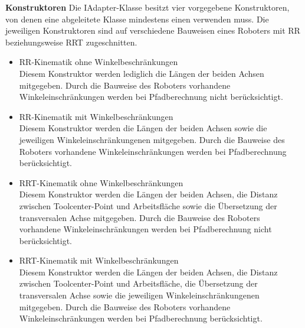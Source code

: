 \textbf{Konstruktoren}
Die IAdapter-Klasse besitzt vier vorgegebene Konstruktoren, von denen eine abgeleitete Klasse mindestens einen verwenden muss. Die jeweiligen Konstruktoren sind auf verschiedene Bauweisen eines Roboters mit RR beziehungsweise RRT zugeschnitten.
\begin{itemize}
\item RR-Kinematik ohne Winkelbeschränkungen\\
Diesem Konstruktor werden lediglich die Längen der beiden Achsen mitgegeben. Durch die Bauweise des Roboters vorhandene Winkeleinschränkungen werden bei Pfadberechnung nicht berücksichtigt.
\item RR-Kinematik mit Winkelbeschränkungen\\
Diesem Konstruktor werden die Längen der beiden Achsen sowie die jeweiligen Winkeleinschränkungenen mitgegeben. Durch die Bauweise des Roboters vorhandene Winkeleinschränkungen werden bei Pfadberechnung berücksichtigt.
\item RRT-Kinematik ohne Winkelbeschränkungen\\
Diesem Konstruktor werden die Längen der beiden Achsen, die Distanz zwischen Toolcenter-Point und Arbeitsfläche sowie die Übersetzung der transversalen Achse mitgegeben. Durch die Bauweise des Roboters vorhandene Winkeleinschränkungen werden bei Pfadberechnung nicht berücksichtigt.
\item RRT-Kinematik mit Winkelbeschränkungen\\
Diesem Konstruktor werden die Längen der beiden Achsen, die Distanz zwischen Toolcenter-Point und Arbeitsfläche, die Übersetzung der transversalen Achse sowie die jeweiligen Winkeleinschränkungenen mitgegeben. Durch die Bauweise des Roboters vorhandene Winkeleinschränkungen werden bei Pfadberechnung berücksichtigt.
\end{itemize}

